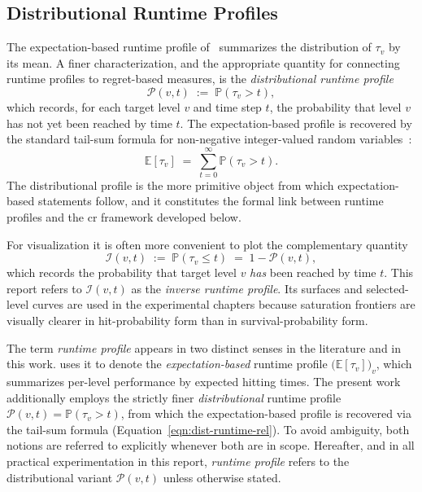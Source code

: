 \subsection{Distributional Runtime Profiles}

The expectation-based runtime profile of~\cite{pinto2018practice} summarizes the
distribution of $\tau_v$ by its mean. A finer characterization, and
the appropriate
quantity for connecting runtime profiles to regret-based measures, is the
\textit{distributional runtime profile}
\begin{equation}
  \mathcal{P}(v, t) \;:=\; \mathbb{P}(\tau_v > t),
\end{equation}
which records, for each target level $v$ and time step $t$, the
probability that level
$v$ has not yet been reached by time $t$. The expectation-based
profile is recovered by
the standard tail-sum formula for non-negative integer-valued random
variables~\cite[p.~16]{doerr2020theory}:
\begin{equation}
  \label{eqn:dist-runtime-rel}
  \mathbb{E}[\tau_v] \;=\; \sum_{t=0}^{\infty} \mathbb{P}(\tau_v > t).
\end{equation}
The distributional profile is the more primitive object from which
expectation-based
statements follow, and it constitutes the formal link between runtime
profiles and
the \acrshort{cr} framework developed below.

For visualization it is often more convenient to plot the complementary
quantity
\begin{equation}
  \mathcal{I}(v, t) \;:=\; \mathbb{P}(\tau_v \leq t)
  \;=\; 1 - \mathcal{P}(v, t),
\end{equation}
which records the probability that target level $v$ \emph{has} been reached by
time $t$. This report refers to $\mathcal{I}(v,t)$ as the
\textit{inverse runtime profile}. Its surfaces and selected-level curves are
used in the experimental chapters because saturation frontiers are visually
clearer in hit-probability form than in survival-probability form.

\begin{remark}
  \label{rem:profile-naming}
  The term \emph{runtime profile} appears in two distinct senses in
  the literature and in
  this work. \cite{pinto2018practice} uses it to denote the
  \emph{expectation-based} runtime profile
  $\bigl(\mathbb{E}[\tau_v]\bigr)_v$, which
  summarizes per-level performance by expected hitting times. The
  present work additionally
  employs the strictly finer \emph{distributional} runtime profile
  $\mathcal{P}(v,t) =
  \mathbb{P}(\tau_v > t)$, from which the expectation-based profile
  is recovered via the
  tail-sum formula (Equation~\ref{eqn:dist-runtime-rel}). To avoid
  ambiguity, both
  notions are referred to explicitly whenever both are in scope.
  Hereafter, and in all
  practical experimentation in this report, \emph{runtime profile} refers to the
  distributional variant $\mathcal{P}(v,t)$ unless otherwise stated.
\end{remark}

